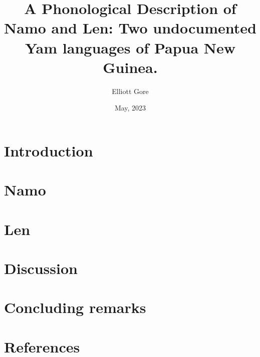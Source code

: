 \documentclass[12pt, oneside]{book}%
\title{A Phonological Description of Namo and Len:
    Two undocumented Yam languages of Papua New Guinea.}
\author{Elliott Gore}
\date{May, 2023}
\begin{document}



\frontmatter %









\tableofcontents



\listoffigures
{}

\listoftables
{}


\mainmatter %


\chapter{Introduction} \label{intro}


\chapter{Namo} \label{namo}


\chapter{Len} \label{len}


\chapter{Discussion} \label{discussion}


\chapter{Concluding remarks} \label{conclusion}


\chapter*{References}

\printbibliography[heading=none]
\end{document}
